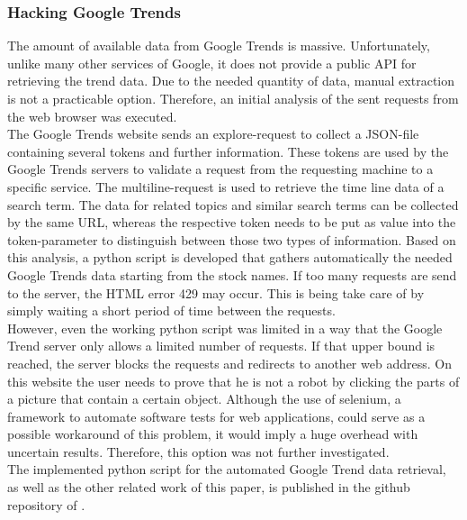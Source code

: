 \subsubsection{Hacking Google Trends}
\label{subsub:hackinggt}
The amount of available data from Google Trends is massive. Unfortunately, unlike many other services of Google, it does not provide a public API for retrieving the trend data. Due to the needed quantity of data, manual extraction is not a practicable option. Therefore, an initial analysis of the sent requests from the web browser was executed. 
\\
The Google Trends website sends an explore-request to collect a JSON-file containing several tokens and further information. These tokens are used by the Google Trends servers to validate a request from the requesting machine to a specific service. The multiline-request is used to retrieve the time line data of a search term. The data for related topics and similar search terms can be collected by the same URL, whereas the respective token needs to be put as value into the token-parameter to distinguish between those two types of information. Based on this analysis, a python script is developed that gathers automatically the needed Google Trends data starting from the stock names. If too many requests are send to the server, the HTML error 429 may occur. This is being take care of by simply waiting a short period of time between the requests. 
\\
However, even the working python script was limited in a way that the Google Trend server only allows a limited number of requests. If that upper bound is reached, the server blocks the requests and redirects to another web address. On this website the user needs to prove that he is not a robot by clicking the parts of a picture that contain a certain object. Although the use of selenium, a framework to automate software tests for web applications, could serve as a possible workaround of this problem, it would imply a huge overhead with uncertain results. Therefore, this option was not further investigated. 
\\
The implemented python script for the automated Google Trend data retrieval, as well as the other related work of this paper, is published in the github repository of \cite{githubrepo}. 

